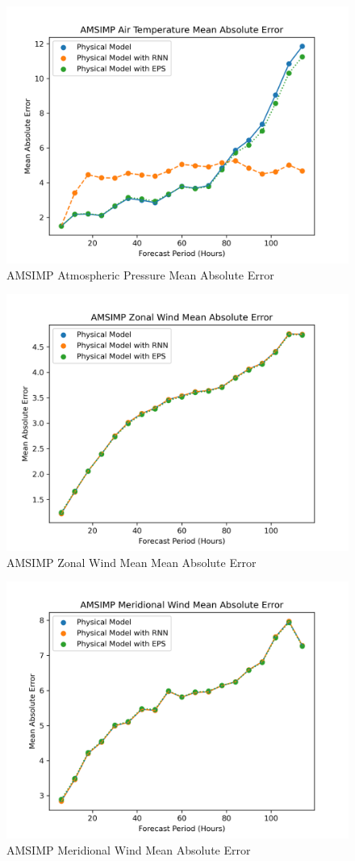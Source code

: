 \begin{appendices}
    \begin{figure}[H]
        \centering
        \includegraphics[width=.7\linewidth]{Graphs/accuracy/appendices/amsimp/geopotential_height/mean_absolute_error.png}
        \caption{AMSIMP Atmospheric Pressure Mean Absolute Error}
    \end{figure}
    
    \begin{figure}[H]
        \centering
        \includegraphics[width=.7\linewidth]{Graphs/accuracy/appendices/amsimp/zonal_wind/mean_absolute_error.png}
        \caption{AMSIMP Zonal Wind Mean Mean Absolute Error}
    \end{figure}
    
    \begin{figure}[H]
        \centering
        \includegraphics[width=.7\linewidth]{Graphs/accuracy/appendices/amsimp/meridional_wind/mean_absolute_error.png}
        \caption{AMSIMP Meridional Wind Mean Absolute Error}
    \end{figure}
    

\end{appendices}
